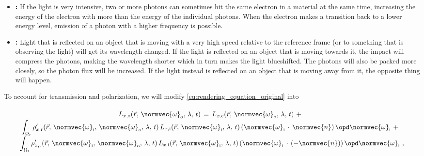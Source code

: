 {\begin{itemize}
\item \textbf{:} If the light is very intensive, two or more photons can sometimes hit the same electron in a material at the same time, increasing the energy of the electron with more than the energy of the individual photons. When the electron makes a transition back to a lower energy level, emission of a photon with a higher frequency is possible.
    
\item \textbf{:} Light that is reflected on an object that is moving with a very high speed relative to the reference frame (or to something that is observing the light) will get its wavelength changed. If the light is reflected on an object that is moving towards it, the impact will compress the photons, making the wavelength shorter which in turn makes the light blueshifted. The photons will also be packed more closely, so the photon flux will be increased. If the light instead is reflected on an object that is moving away from it, the opposite thing will happen.
\end{itemize}

To account for transmission and polarization, we will modify \eqref{eq:rendering_equation_original} into

\begin{equation} \label{eq:rendering_equation_improved}
\renewcommand*{\arraystretch}{1.5}
\begin{array}{cl}
L_{x,\text{o}}(\vec{r},\,\normvec{\omega}_{\text{o}},\, \lambda,\, t) \,=\, L_{x,\text{e}}(\vec{r},\, \normvec{\omega}_{\text{o}},\, \lambda,\, t) \ + \\
\displaystyle \int_{\Omega_{\text{r}}} \rho'_{x,\text{r}}(\vec{r},\, \normvec{\omega}_{\text{i}},\, \normvec{\omega}_{\text{o}},\, \lambda,\, t)\, L_{x,\text{i}}(\vec{r},\, \normvec{\omega}_{\text{i}},\, \lambda,\, t)\, (\normvec{\omega}_{\text{i}}\,\cdot\,\normvec{n})\, \opd \normvec{\omega}_{\text{i}} \ + \\
\displaystyle \int_{\Omega_{\text{t}}} \rho'_{x,\text{t}}(\vec{r},\, \normvec{\omega}_{\text{i}},\, \normvec{\omega}_{\text{o}},\, \lambda,\, t)\, L_{x,\text{i}}(\vec{r},\, \normvec{\omega}_{\text{i}},\, \lambda,\, t)\, (\normvec{\omega}_{\text{i}}\,\cdot\,(-\normvec{n}))\, \opd \normvec{\omega}_{\text{i}} & \!\!\!\! ,
\end{array}
\end{equation}

}
